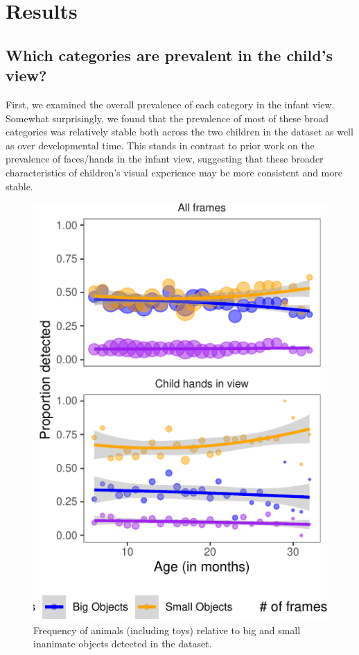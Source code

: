 \documentclass[10pt, letterpaper]{article}
\newenvironment{CodeChunk}{}{}
\begin{document}
\hypertarget{results}{%
\section{Results}\label{results}}

\hypertarget{which-categories-are-prevalent-in-the-childs-view}{%
\subsection{Which categories are prevalent in the child's
view?}\label{which-categories-are-prevalent-in-the-childs-view}}

First, we examined the overall prevalence of each category in the infant
view. Somewhat surprisingly, we found that the prevalence of most of
these broad categories was relatively stable both across the two
children in the dataset as well as over developmental time. This stands
in contrast to prior work on the prevalence of faces/hands in the infant
view, suggesting that these broader characteristics of children's visual
experience may be more consistent and more stable.

\begin{CodeChunk}
\begin{figure}[h]

{\centering \includegraphics{figs/anim_size-1} 

}

\caption[Frequency of animals (including toys) relative to big and small inanimate objects detected in the dataset]{Frequency of animals (including toys) relative to big and small inanimate objects detected in the dataset.}\label{fig:anim_size}
\end{figure}
\end{CodeChunk}
\end{document}
